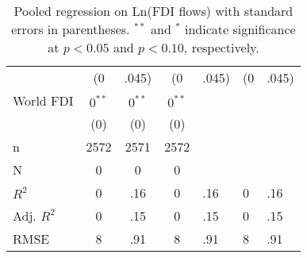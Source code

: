 \begin{table}[ht]
\begin{tabular}{lccc}
   & (0&.045) & (0&.045) & (0&.045) \\ 
  World FDI & $0^{\ast\ast}$ & $0^{\ast\ast}$ & $0^{\ast\ast}$ \\ 
   & (0) & (0) & (0) \\ 
   \hline
n & 2572 & 2571 & 2572 \\ 
  N & 0 & 0 & 0 \\ 
  $R^{2}$ & 0&.16 & 0&.16 & 0&.16 \\ 
  Adj. $R^{2}$ & 0&.15 & 0&.15 & 0&.15 \\ 
  RMSE & 8&.91 & 8&.91 & 8&.91 \\ 
   \hline
\hline
\end{tabular}
\endgroup
\caption{Pooled regression on Ln(FDI flows) with standard errors in parentheses. $^{**}$ and $^{*}$ indicate significance at $p< 0.05 $ and $p< 0.10 $, respectively.} 
\end{table}
